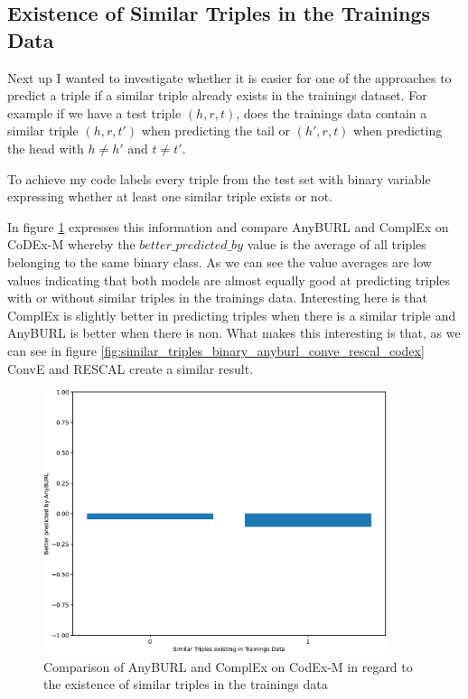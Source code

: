 \subsection{Existence of Similar Triples in the Trainings Data}
Next up I wanted to investigate whether it is easier for one of the approaches to predict a triple if a similar triple already exists in the trainings dataset. 
For example if we have a test triple $(h,r,t)$, does the trainings data contain a similar triple $(h,r,t')$ when predicting the tail or $(h',r,t)$ when predicting the head with $h\neq h'$ and $t\neq t'$. 

To achieve my code labels every triple from the test set with binary variable expressing whether at least one similar triple exists or not. 

In figure \ref{fig:similar_triples_binary_anyburl_complex_codex} expresses this information and compare AnyBURL and ComplEx on CoDEx-M whereby the $better\_predicted\_by$ value is the average of all triples belonging to the same binary class. As we can see the value averages are low values indicating that both models are almost equally good at predicting triples with or without similar triples in the trainings data. Interesting here is that ComplEx is slightly better in predicting triples when there is a similar triple and AnyBURL is better when there is non. What makes this interesting is that, as we can see in figure \ref{fig:similar_triples_binary_anyburl_conve_rescal_codex} ConvE and RESCAL create a similar result. 

\begin{figure}[H]
\centering
\includegraphics[width=0.9\textwidth]{images/similar_triples_binary_anyburl_complex_codex.PNG}
\caption{Comparison of AnyBURL and ComplEx on CodEx-M in regard to the existence of similar triples in the trainings data}
\label{fig:similar_triples_binary_anyburl_complex_codex}
\end{figure}

